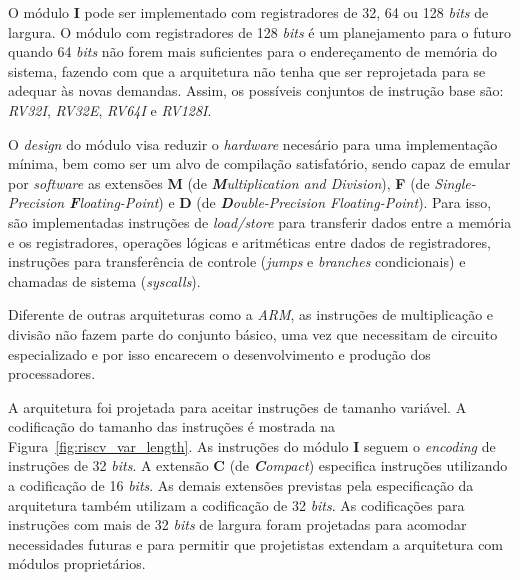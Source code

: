     { O módulo \textbf{I} pode ser implementado com registradores de 32, 64 ou
        128 \textit{bits} de largura. O módulo com registradores de 128
        \textit{bits} é um planejamento para o futuro quando 64 \textit{bits}
        não forem mais suficientes para o endereçamento de memória do sistema,
        fazendo com que a arquitetura não tenha que ser reprojetada para se
        adequar às novas demandas. Assim, os possíveis conjuntos de instrução
        base são: \textit{RV32I}, \textit{RV32E}, \textit{RV64I} e \textit{RV128I}.
    }

    { O \textit{design} do módulo visa reduzir o \textit{hardware} necesário para
        uma implementação mínima, bem como ser um alvo de compilação satisfatório,
        sendo capaz de emular por \textit{software} as extensões \textbf{M}
        (de \textit{\textbf{M}ultiplication and Division}), \textbf{F} (de
        \textit{Single-Precision \textbf{F}loating-Point}) e \textbf{D} (de
        \textit{\textbf{D}ouble-Precision Floating-Point}). Para isso, são
        implementadas instruções de \textit{load/store} para transferir dados
        entre a memória e os registradores, operações lógicas e aritméticas
        entre dados de registradores, instruções para transferência de controle
        (\textit{jumps} e \textit{branches} condicionais) e chamadas de sistema
        (\textit{syscalls}).
    }

    { Diferente de outras arquiteturas como a \textit{ARM}, as instruções de
        multiplicação e divisão não fazem parte do conjunto básico, uma vez que
        necessitam de circuito especializado e por isso encarecem o desenvolvimento
        e produção dos processadores.
    }

    { A arquitetura foi projetada para aceitar instruções de tamanho variável.
        A codificação do tamanho das instruções é mostrada na
        Figura~\ref{fig:riscv_var_length}. As instruções do módulo \textbf{I}
        seguem o \textit{encoding} de instruções de 32 \textit{bits}. A extensão
        \textbf{C} (de \textit{\textbf{C}ompact}) especifica instruções utilizando
        a codificação de 16 \textit{bits}. As demais extensões previstas pela
        especificação da arquitetura também utilizam a codificação de 32
        \textit{bits}. As codificações para instruções com mais de 32
        \textit{bits} de largura foram projetadas para acomodar necessidades
        futuras e para permitir que projetistas extendam a arquitetura com módulos
        proprietários.
    }

